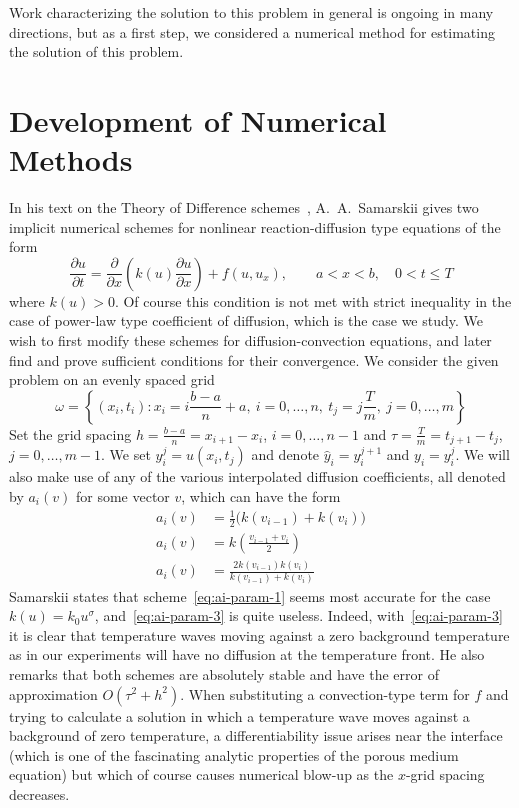 \documentclass[12pt, reqno]{amsart}
\newcommand{\D}[2]{\frac{\partial{} #1}{\partial{} #2}}
\newcommand{\bk}[1]{\left\{#1\right\}}
\begin{document}
Work characterizing the solution to this problem in general is ongoing in many directions, but as a first step, we considered a numerical method for estimating the solution of this problem.

\section{Development of Numerical Methods}
In his text on the Theory of Difference schemes~\citep{samarskii01}, A.\ A.\ Samarskii gives two implicit numerical schemes for nonlinear reaction-diffusion type equations of the form
\[ \D{u}{t}=\D{}{x}\left( k(u)\D{u}{x}\right)+f(u, u_x),\qquad a < x < b,\quad 0 < t \leq T\]
where $k(u)>0$.
Of course this condition is not met with strict inequality in the case of power-law type coefficient of diffusion, which is the case we study.
We wish to first modify these schemes for diffusion-convection equations, and later find and prove sufficient conditions for their convergence.
We consider the given problem on an evenly spaced grid
\[
  \omega=\bk{(x_{i},t_{i}):x_{i}=i \frac{b-a}{n} + a,
    ~ i=0,\ldots,n,
    ~t_{j}=j \frac{T}{m},
    ~j=0,\ldots,m}
\]
Set the grid spacing $h=\frac{b-a}{n}=x_{i+1}-x_{i}$, $i=0,\ldots,n-1$ and $\tau=\frac{T}{m}=t_{j+1}-t_{j}$, $j=0,\ldots,m-1$.
We set $y_{i}^{j}=u(x_{i},t_{j})$ and denote $\hat{y}_{i}=y_{i}^{j+1}$ and $y_{i}=y_{i}^{j}$.
We will also make use of any of the various interpolated diffusion coefficients, all denoted by $a_{i}(v)$ for some vector $v$, which can have the form
\begin{align}
  a_{i}(v) & =\frac{1}{2}\big( k(v_{i-1})+k(v_{i})\big)\label{eq:ai-param-1}
  \\
  a_{i}(v) & =k\left(\frac{v_{i-1} + v_{i}}{2}\right)\label{eq:ai-param-2}
  \\
  a_{i}(v) & =\frac{2k(v_{i-1})k(v_{i})}{k(v_{i-1})+k(v_{i})}\label{eq:ai-param-3}
\end{align}
Samarskii states that scheme~\eqref{eq:ai-param-1} seems most accurate for the case $k(u)=k_{0}u^{\sigma}$, and~\eqref{eq:ai-param-3} is quite useless.
Indeed, with~\eqref{eq:ai-param-3} it is clear that temperature waves moving against a zero background temperature as in our experiments will have no diffusion at the temperature front.
He also remarks that both schemes are absolutely stable and have the error of approximation $O(\tau^{2}+h^{2})$.
When substituting a convection-type term for $f$ and trying to calculate a solution in which a temperature wave moves against a background of zero temperature, a differentiability issue arises near the interface (which is one of the fascinating analytic properties of the porous medium equation) but which of course causes numerical blow-up as the $x$-grid spacing decreases.
\end{document}
